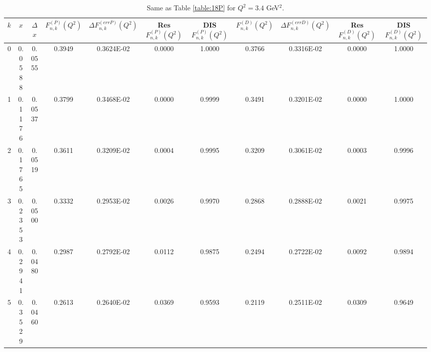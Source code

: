 \documentclass[
twocolumn,
aps,prd,
nofootinbib,
superscriptaddress,
showpacs,ligh
tightenlines, 
]{revtex4}
\begin{document}
\begin{widetext}
\begin{table}[h]
\begin{center}
\begin{tabular}{|c|c|c|c|c|c|c|c|c|c|c|}
 \hline
\hline


\end{tabular}

\label{table:25P} 
\end{center}
 \end{table}

\begin{table}[h]
\begin{center}
\caption{Same as Table \ref{table:18P} for  $Q^{2} = 3.4$ GeV$^{2}$.}
\begin{tabular}{|c|c|c|c|c|c|c|c|c|c|c|}
\hline
\hline
  $k$  & $x$   & $\Delta$ $x$   &  $F_{n,k}^{(P)}(Q^{2})$  & $\Delta F_{n,k}^{(err P )}(Q^{2})$ &  Res $F_{n,k}^{(P)}(Q^{2})$  & DIS     $F_{n,k}^{(P)}(Q^{2})$  &   $F_{n,k}^{(D)}(Q^{2})$  & $\Delta F_{n,k}^{(err D )}(Q^{2})$ &  Res $F_{n,k}^{(D)}(Q^{2})$  & DIS     $F_{n,k}^{(D)}(Q^{2})$     \\
\hline
\hline
    0                 &        0.0588             &        0.0555             &     0.3949                 &     0.3624E-02             &        0.0000             &        1.0000             & 0.3766 & 0.3316E-02 & 0.0000 & 1.0000 \\
      1                 &        0.1176             &        0.0537             &     0.3799                 &     0.3468E-02             &        0.0000             &        0.9999             & 0.3491 & 0.3201E-02 & 0.0000 & 1.0000 \\
      2                 &        0.1765             &        0.0519             &     0.3611                 &     0.3209E-02             &        0.0004             &        0.9995            & 0.3209 & 0.3061E-02 & 0.0003 & 0.9996 \\
      3                 &        0.2353             &        0.0500             &     0.3332                 &     0.2953E-02             &        0.0026             &        0.9970             & 0.2868 & 0.2888E-02 & 0.0021 & 0.9975 \\
      4                 &        0.2941             &        0.0480             &     0.2987                 &     0.2792E-02             &        0.0112             &        0.9875             & 0.2494 & 0.2722E-02 & 0.0092 & 0.9894 \\
      5                &        0.3529             &        0.0460             &     0.2613                 &     0.2640E-02             &        0.0369             &        0.9593             & 0.2119 & 0.2511E-02 & 0.0309 & 0.9649 \\

\end{tabular}
\end{center}
\end{table}
\end{widetext}
\end{document}
